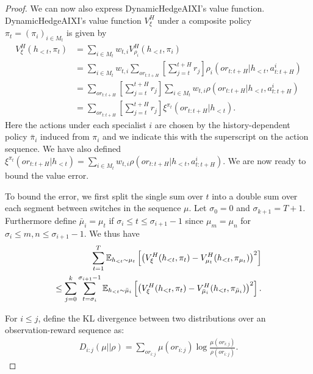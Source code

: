 \begin{proof}
        We can now also express DynamicHedgeAIXI's value function. DynamicHedgeAIXI's value function $V^{H}_{\xi}$ under a composite policy $\pi_t = (\pi_i)_{i \in M_t}$ is given by
        \begin{align*}
            V^{H}_{\xi}(h_{<t}, \pi_t) &= \sum_{i \in M_t} w_{t, i} V_{\rho_i}^{H}(h_{<t}, \pi_i)\\
            &= \sum_{i \in M_t} w_{t, i} \sum_{or_{t:t+H}} \left[ \sum_{j=t}^{t+H} r_j \right] \rho_i(or_{t:t+H} | h_{<t}, a^{i}_{t:t+H}) \\
            &= \sum_{or_{t:t+H}} \left[ \sum_{j=t}^{t+H} r_j \right] \sum_{i \in M_t} w_{t, i}  \rho(or_{t:t+H} | h_{<t}, a^{i}_{t:t+H})\\
            &= \sum_{or_{t:t+H}} \left[ \sum_{j=t}^{t+H} r_j \right] \xi^{\pi_t}(or_{t:t+H} | h_{<t}).
        \end{align*}
        Here the actions under each specialist $i$ are chosen by the history-dependent policy $\bar{\pi}_i$ induced from $\pi_i$ and we indicate this with the superscript on the action sequence. We have also defined $\xi^{\pi_t}(or_{t:t+H} | h_{<t}) = \sum_{i \in M_t} w_{t, i}  \rho(or_{t:t+H} | h_{<t}, a^{i}_{t:t+H})$. We are now ready to bound the value error.
    
        To bound the error, we first split the single sum over $t$ into a double sum over each segment between switches in the sequence $\mu$. Let $\sigma_0 = 0$ and $\sigma_{k+1} = T+1$. Furthermore define $\bar{\mu}_i = \mu_t$ if $\sigma_i \leq t \leq \sigma_{i+1}-1$ since $\mu_m = \mu_n$ for $\sigma_i \leq m, n \leq \sigma_{i+1}-1$. 
        We thus have
        \begin{align*}
            \sum_{t=1}^{T} \mathbb{E}_{h_{<t} \sim \mu_t} \left[ \left( V_{\xi}^{H}(h_{<t}, \pi_t) - V_{\mu_t}^{H}(h_{<t}, \pi_{\mu_t}) \right)^2 \right]\\
            \leq \sum_{j=0}^{k} \sum_{t=\sigma_i}^{\sigma_{i+1}-1} \mathbb{E}_{h_{<t} \sim \bar{\mu}_i} \left[ \left( V_{\xi}^{H}(h_{<t}, \pi_t) - V_{\bar{\mu}_i}^{H}(h_{<t}, \pi_{\bar{\mu}_i}) \right)^2 \right].
        \end{align*}
    
        For $i \leq j$, define the KL divergence between two distributions over an observation-reward sequence as:
        \begin{align*}
            D_{i:j}(\mu || \rho) = \sum_{or_{i:j}} \mu(or_{i:j}) \log \frac{\mu(or_{i:j})}{\rho(or_{i:j})}.
        \end{align*}
    

\end{proof}
